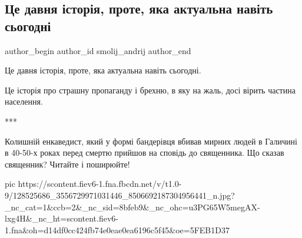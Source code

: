  
 
 
 
 
 
\subsection{Це давня історія, проте, яка актуальна навіть сьогодні}
\label{sec:29_11_2020.fb.smolij_andrij.1.davnja_istorija_nkvd}
\ifcmt
	author_begin
   author_id smolij_andrij
	author_end
\fi


Це давня історія, проте, яка актуальна навіть сьогодні. 

Це історія про страшну пропаганду і брехню, в яку на жаль, досі вірить частина населення.

***

Колишній енкаведист, який у формі бандерівця вбивав мирних людей в Галичині в
40-50-х роках перед смертю прийшов на сповідь до священника. Що сказав
священник? Читайте і поширюйте! 

\ifcmt
pic https://scontent.fiev6-1.fna.fbcdn.net/v/t1.0-9/128525686_3556729971031446_8506692187304956441_n.jpg?_nc_cat=1&ccb=2&_nc_sid=8bfeb9&_nc_ohc=u3PG65W5megAX-lxg4H&_nc_ht=scontent.fiev6-1.fna&oh=d14df0cc424fb74e0eae0ea6196c5f45&oe=5FEB1D37
\fi

